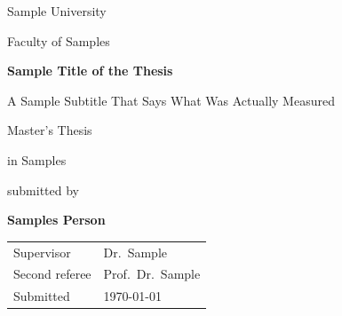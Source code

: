 \begin{titlepage}
\thispagestyle{empty}
\centering

{\Large Sample University\par}
{\large Faculty of Samples\par}

\vspace{3cm}

{\huge\bfseries Sample Title of the Thesis\par}

\vspace{0.8cm}

{\Large A Sample Subtitle That Says What Was Actually Measured\par}

\vspace{3cm}

{\large Master's Thesis\par}
{\large in Samples\par}

\vspace{2cm}

{\large submitted by\par}
{\Large\bfseries Samples Person\par}

\vfill

\begin{tabular}{@{}ll@{}}
Supervisor     & Dr.\ Sample \\
Second referee & Prof.\ Dr.\ Sample  \\
Submitted      & \today \\
\end{tabular}

\end{titlepage}
\setcounter{page}{2}   %
\clearpage

